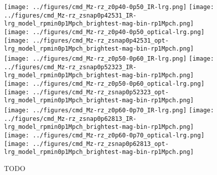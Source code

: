 \documentclass[twocolumn,apj,iop,tighten]{emulateapj2}
\begin{document}
\begin{figure*}
\centering
\texttt{[image: ../figures/cmd\_Mz-rz\_z0p40-0p50\_IR-lrg.png]}
\texttt{[image: ../figures/cmd\_Mz-rz\_zsnap0p42531\_IR-lrg\_model\_rpmin0p1Mpch\_brightest-mag-bin-rp1Mpch.png]}
\texttt{[image: ../figures/cmd\_Mz-rz\_z0p40-0p50\_optical-lrg.png]}
\texttt{[image: ../figures/cmd\_Mz-rz\_zsnap0p42531\_opt-lrg\_model\_rpmin0p1Mpch\_brightest-mag-bin-rp1Mpch.png]}
\\
\texttt{[image: ../figures/cmd\_Mz-rz\_z0p50-0p60\_IR-lrg.png]}
\texttt{[image: ../figures/cmd\_Mz-rz\_zsnap0p52323\_IR-lrg\_model\_rpmin0p1Mpch\_brightest-mag-bin-rp1Mpch.png]}
\texttt{[image: ../figures/cmd\_Mz-rz\_z0p50-0p60\_optical-lrg.png]}
\texttt{[image: ../figures/cmd\_Mz-rz\_zsnap0p52323\_opt-lrg\_model\_rpmin0p1Mpch\_brightest-mag-bin-rp1Mpch.png]}
\\
\texttt{[image: ../figures/cmd\_Mz-rz\_z0p60-0p70\_IR-lrg.png]}
\texttt{[image: ../figures/cmd\_Mz-rz\_zsnap0p62813\_IR-lrg\_model\_rpmin0p1Mpch\_brightest-mag-bin-rp1Mpch.png]}
\texttt{[image: ../figures/cmd\_Mz-rz\_z0p60-0p70\_optical-lrg.png]}
\texttt{[image: ../figures/cmd\_Mz-rz\_zsnap0p62813\_opt-lrg\_model\_rpmin0p1Mpch\_brightest-mag-bin-rp1Mpch.png]}
\caption{TODO
}
\label{fig:cmd_opt_lrg}
\end{figure*}
\end{document}
